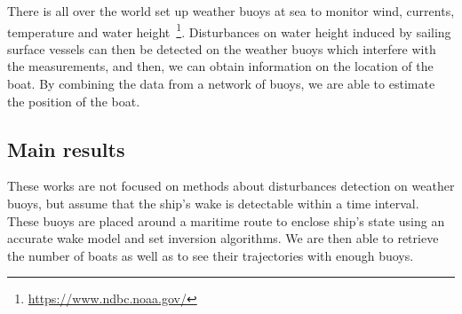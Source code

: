 \documentclass[14pt, a4paper]{article}
\begin{document}
		There is all over the world set up weather buoys at sea to monitor wind, currents, temperature and water height~\footnote{\url{https://www.ndbc.noaa.gov/}}. Disturbances on water height induced by sailing surface vessels can then be detected on the weather buoys which interfere with the measurements, and then, we can obtain information on the location of the boat. By combining the data from a network of buoys, we are able to estimate the position of the boat.

	\subsection*{Main results}
		These works are not focused on methods about disturbances detection on weather buoys, but assume that the ship's wake is detectable within a time interval. These buoys are placed around a maritime route to enclose ship's state using an accurate wake model and set inversion algorithms. We are then able to retrieve the number of boats as well as to see their trajectories with enough buoys.
		
	\printbibliography[title={References},heading=subbibliography]

	\medskip
\end{document}
